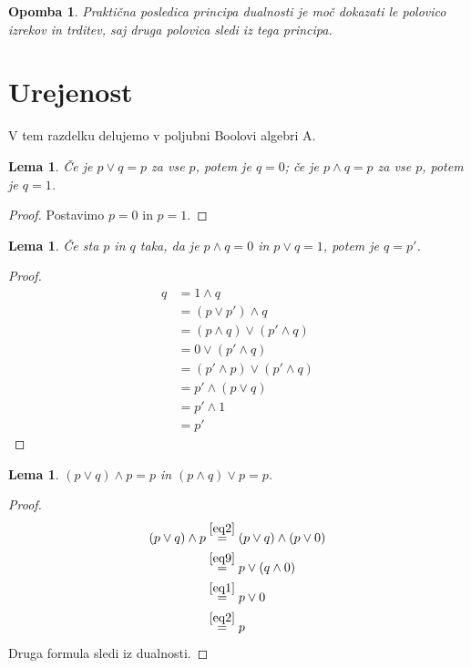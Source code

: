 \documentclass{amsart}
\newtheorem{lema}[izrek]{Lema}
\newtheorem{opomba}[izrek]{Opomba}
\begin{document}
\begin{opomba}
    Praktična posledica principa dualnosti je moč dokazati le polovico izrekov in trditev, 
    saj druga polovica sledi iz tega principa.
\end{opomba}

\section{Urejenost}

V tem razdelku delujemo v poljubni Boolovi algebri A.

\begin{lema}
    \label{lema-1}
    Če je \(p \vee q = p\) za vse \(p\), potem je \(q = 0\); če je 
    \(p \wedge q = p\) za vse \(p\), potem je \(q = 1\).
\end{lema}

\begin{proof}
    Postavimo $p = 0$ in $p = 1$.
\end{proof}

\begin{lema}
    \label{lema0}
    Če sta $p$ in $q$ taka, da je $p\wedge q = 0$ in $p \vee q = 1$, potem je $q = p'$.
\end{lema}

\begin{proof}
    \begin{align*}
        q &= 1 \wedge q\\ &= (p \vee p') \wedge q  \\&=(p \wedge q) \vee (p' \wedge q) \\ &= 
        0 \vee (p' \wedge q)\\  &= (p' \wedge p) \vee (p' \wedge q) \\  &= p' \wedge (p \vee q) 
        \\  &= p' \wedge 1
        \\  &= p'
    \end{align*}
\end{proof}

\begin{lema}
    \label{lema1}
    \(\left(p \vee q\right) \wedge p = p\) in \(\left(p \wedge q\right) \vee p = p\).
\end{lema}

\begin{proof} 
    \begin{align*}
        \left(p \vee q\right) \wedge p &\stackrel{\eqref{eq2}}{=} \left(p \vee q\right) \wedge \left(p \vee 0 \right) \\
                    &\stackrel{\eqref{eq9}}{=} p \vee \left(q \wedge 0\right)\\
                    &\stackrel{\eqref{eq1}}{=} p \vee 0\\
                    &\stackrel{\eqref{eq2}}{=} p 
    \end{align*}
    Druga formula sledi iz dualnosti.

\end{proof}
\end{document}
